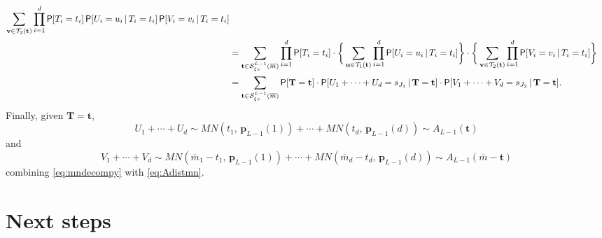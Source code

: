 \documentclass[11pt,draft]{article}
\newcommand{\Ssp}{\mathcal{S}}
\newcommand{\Tsp}{\mathcal{T}}
\newcommand{\pv}{\mathbf{p}}
\newcommand{\mb}{\overline{m}}
\begin{document}
\begin{pf}
\begin{align*}
\sum_{\mathbf{v} \in \Tsp_2(\mathbf{t})} \prod_{i = 1}^d
\P[T_i = t_i] \P[U_i = u_i \given T_i = t_i]
\P[V_i = v_i \given T_i = t_i] \\
&= \sum_{\mathbf{t}\in\Ssp_{\xi s}^{L-1}(\mb)} \prod_{i = 1}^d \P[T_i = t_i]
\cdot \bigg\{ \sum_{\mathbf{u} \in \Tsp_1(\mathbf{t})} \prod_{i = 1}^d
\P[U_i = u_i \given T_i = t_i] \bigg\} \cdot
\bigg\{ \sum_{\mathbf{v} \in \Tsp_2(\mathbf{t})} \prod_{i = 1}^d
\P[V_i = v_i \given T_i = t_i] \bigg\}\\
&= \sum_{\mathbf{t}\in\Ssp_{\xi s}^{L-1}(\mb)} \P[\mathbf{T} = \mathbf{t}]
\cdot \P[U_1 + \cdots + U_d = s_{J_1} \given \mathbf{T} = \mathbf{t}] \cdot
\P[V_1 + \cdots + V_d = s_{J_2} \given \mathbf{T} = \mathbf{t}].
\end{align*}
Finally, given $\mathbf{T} = \mathbf{t}$,
\[ U_1 + \cdots + U_d \sim
MN(t_1,\, \pv_{L-1}(1)) + \cdots + MN(t_d,\, \pv_{L-1}(d)) \sim
A_{L-1}(\mathbf{t}) \]
and
\[ V_1 + \cdots + V_d \sim
MN(\mb_1 - t_1,\, \pv_{L-1}(1)) + \cdots + MN(\mb_d - t_d,\, \pv_{L-1}(d)) \sim
A_{L-1}(\mb - \mathbf{t}) \]
combining \eqref{eq:mndecompy} with \eqref{eq:Adistmn}.
\end{pf}


\section{Next steps}
\end{document}
